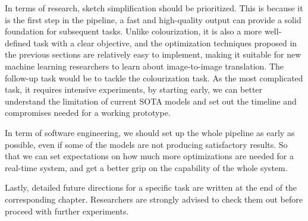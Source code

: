 In terms of research, sketch simplification should be prioritized. This is because it is the first step in the pipeline, a fast and high-quality output can provide a solid foundation for subsequent tasks. Unlike colourization, it is also a more well-defined task with a clear objective, and the optimization techniques proposed in the previous sections are relatively easy to implement, making it suitable for new machine learning researchers to learn about image-to-image translation. The follow-up task would be to tackle the colourization task. As the most complicated task, it requires intensive experiments, by starting early, we can better understand the limitation of current SOTA models and set out the timeline and compromises needed for a working prototype.

In term of software engineering, we should set up the whole pipeline as early as possible, even if some of the models are not producing satisfactory results. So that we can set expectations on how much more optimizations are needed for a real-time system, and get a better grip on the capability of the whole system.

Lastly, detailed future directions for a specific task are written at the end of the corresponding chapter. Researchers are strongly advised to check them out before proceed with further experiments.


